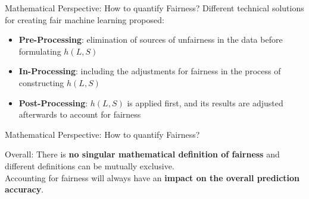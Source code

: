 \begin{frame}{Mathematical Perspective: How to quantify Fairness? \cite{Berk.2018}}
    Different technical solutions for creating fair machine learning proposed:
    
    \begin{itemize}
        \item \textbf{Pre-Processing}: elimination of sources of unfairness in the data before formulating $h(L,S)$
        \item \textbf{In-Processing}: including the adjustments for fairness in the process 
        of constructing $h(L,S)$
        \item \textbf{Post-Processing}: $h(L,S)$ is applied first, and its results are adjusted
        afterwards to account for fairness
    \end{itemize}
\end{frame}

{
\begin{frame}{Mathematical Perspective: How to quantify Fairness? \cite{Berk.2018}}
\vspace{2cm}
\begin{block}{\huge Overall:}
\LARGE 
    There is \textbf{no singular mathematical definition of fairness} and different definitions can be mutually exclusive. \\ 
    Accounting for fairness will always have an \textbf{impact on the overall prediction accuracy}.
\end{block}
\end{frame}
}

